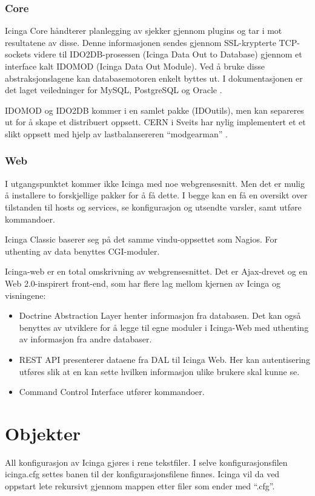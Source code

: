 \subsubsection{Core}
Icinga Core håndterer planlegging av sjekker gjennom plugins og tar i mot resultatene av disse. Denne informasjonen sendes gjennom SSL-krypterte TCP-sockets videre til IDO2DB-prosessen (Icinga Data Out to Database) gjennom et interface kalt IDOMOD (Icinga Data Out Module). Ved å bruke disse abstraksjonslagene kan databasemotoren enkelt byttes ut. I dokumentasjonen er det laget veiledninger for MySQL, PostgreSQL og Oracle \cite{icingaarchitecture}.

IDOMOD og IDO2DB kommer i en samlet pakke (IDOutils), men kan separeres ut for å skape et distribuert oppsett. CERN i Sveits har nylig implementert et et slikt oppsett med hjelp av lastbalansereren “modgearman” \cite{cernthesis}.

\subsubsection{Web}

I utgangspunktet kommer ikke Icinga med noe webgrensesnitt. Men det er mulig å installere to forskjellige pakker for å få dette. I begge kan en få en oversikt over tilstanden til hosts og services, se konfigurasjon og utsendte varsler, samt utføre kommandoer.

Icinga Classic baserer seg på det samme vindu-oppsettet som Nagios. For uthenting av data benyttes CGI-moduler.

Icinga-web er en total omskrivning av webgrensesnittet. Det er Ajax-drevet og en Web 2.0-inspirert front-end, som har flere lag mellom kjernen av Icinga og visningene:

\begin{itemize}
	\item Doctrine Abstraction Layer henter informasjon fra databasen. Det kan også benyttes av utviklere for å legge til egne moduler i Icinga-Web med uthenting av informasjon fra andre databaser.
	\item REST API presenterer dataene fra DAL til Icinga Web. Her kan autentisering utføres slik at en kan sette hvilken informasjon ulike brukere skal kunne se.
	\item Command Control Interface utfører kommandoer.
\end{itemize}

\section{Objekter}
All konfigurasjon av Icinga gjøres i rene tekstfiler. I selve konfigurasjonsfilen icinga.cfg settes banen til der konfigurasjonsfilene finnes. Icinga vil da ved oppstart lete rekursivt gjennom mappen etter filer som ender med “.cfg”.

